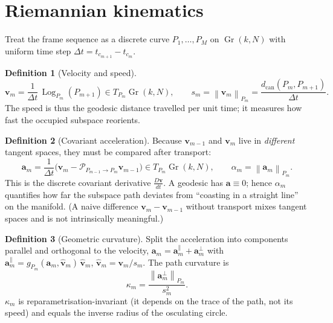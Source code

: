 \documentclass[11pt]{article}
\newcommand{\Gr}{\operatorname{Gr}}
\newcommand{\Log}{\operatorname{Log}}
\newcommand{\PT}{\mathcal{P}}
\newcommand{\norm}[1]{\left\lVert #1 \right\rVert}
\theoremstyle{definition}
\newtheorem{definition}{Definition}
\begin{document}
\section{Riemannian kinematics}
\label{sec:kin}

Treat the frame sequence as a discrete curve $P_1,\dots,P_M$ on $\Gr(k,N)$ with
uniform time step $\Delta t = t_{c_{m+1}}-t_{c_m}$.

\begin{definition}[Velocity and speed]
\begin{equation}
\bm{v}_m = \frac{1}{\Delta t}\,\Log_{P_m}(P_{m+1}) \in T_{P_m}\Gr(k,N),
\qquad
s_m = \norm{\bm{v}_m}_{P_m} = \frac{d_{\mathrm{can}}(P_m,P_{m+1})}{\Delta t}.
\end{equation}
The speed is thus the geodesic distance travelled per unit time; it measures how fast
the occupied subspace reorients.
\end{definition}

\begin{definition}[Covariant acceleration]
Because $\bm{v}_{m-1}$ and $\bm{v}_m$ live in \emph{different} tangent spaces, they
must be compared after transport:
\begin{equation}
\bm{a}_m = \frac{1}{\Delta t}\Big(\bm{v}_m - \PT_{P_{m-1}\to P_m}\bm{v}_{m-1}\Big)
\in T_{P_m}\Gr(k,N),
\qquad
\alpha_m = \norm{\bm{a}_m}_{P_m}.
\end{equation}
This is the discrete covariant derivative $\tfrac{D\bm{v}}{dt}$. A geodesic has
$\bm{a}\equiv 0$; hence $\alpha_m$ quantifies how far the subspace path deviates from
``coasting in a straight line'' on the manifold. (A naive difference
$\bm{v}_m-\bm{v}_{m-1}$ without transport mixes tangent spaces and is not
intrinsically meaningful.)
\end{definition}

\begin{definition}[Geometric curvature]
Split the acceleration into components parallel and orthogonal to the velocity,
$\bm{a}_m = \bm{a}_m^{\parallel} + \bm{a}_m^{\perp}$ with
$\bm{a}_m^{\parallel} = g_{P_m}(\bm{a}_m,\hat{\bm{v}}_m)\,\hat{\bm{v}}_m$,
$\hat{\bm{v}}_m = \bm{v}_m/s_m$. The path curvature is
\begin{equation}
\kappa_m = \frac{\norm{\bm{a}_m^{\perp}}_{P_m}}{s_m^{2}} .
\end{equation}
$\kappa_m$ is reparametrisation-invariant (it depends on the trace of the path, not
its speed) and equals the inverse radius of the osculating circle.
\end{definition}
\end{document}

